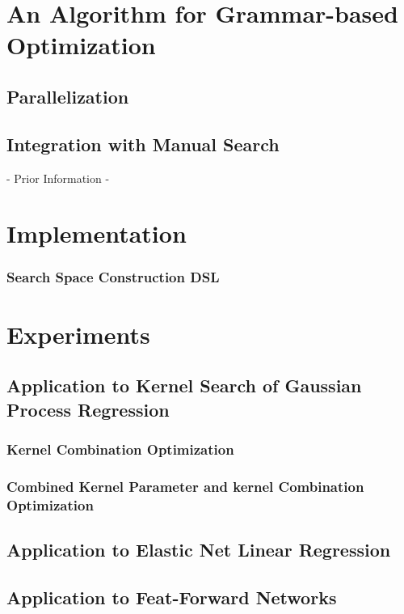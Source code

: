 \documentclass[english]{article}
\begin{document}
\section{An Algorithm for Grammar-based Optimization}
\subsection{Parallelization}
\subsection{Integration with Manual Search}
- Prior Information - 


\section{Implementation}
\subsubsection{Search Space Construction DSL}


\section{Experiments}
\subsection{Application to Kernel Search of Gaussian Process Regression}
\subsubsection{Kernel Combination Optimization}
\subsubsection{Combined Kernel Parameter and kernel Combination Optimization}
\subsection{Application to Elastic Net Linear Regression}
\subsection{Application to Feat-Forward Networks}

\printbibliography
\end{document}
